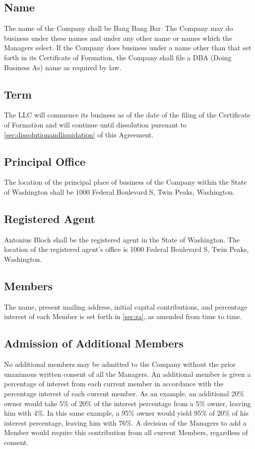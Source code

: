 \documentclass[11pt,onecolumn]{article}
\newcommand{\address}{1000 Federal Boulevard S, Twin Peaks, Washington}
\newcommand{\sa}{\autoref{sec:sa}}
\begin{document}
\subsection{Name}

The name of the Company shall be Bang Bang Bar. The Company may do business under these names and under any other name or names which the Managers select. If the Company does business under a name other than that set forth in its Certificate of Formation, the Company shall file a DBA (Doing Business As) name as required by law.

\subsection{Term}

The LLC will commence its business as of the date of the filing of the Certificate of Formation and will continue until dissolution pursuant to \autoref{sec:dissolutionandliquidation} of this Agreement.

\subsection{Principal Office}

The location of the principal place of business of the Company within the State of Washington shall be \address{}.

\subsection{Registered Agent}

Antonius Bloch shall be the registered agent in the State of Washington. The location of the registered agent's office is \address{}.

\subsection{Members}

The name, present mailing address, initial capital contributions, and percentage interest of each Member is set forth in \sa{}, as amended from time to time.

\subsection{Admission of Additional Members}

No additional members may be admitted to the Company without the prior unanimous written consent of all the Managers.
An additional member is given a percentage of interest from each current member in accordance with the percentage interest of each current member.
As an example, an additional 20\% owner would take 5\% of 20\% of the interest percentage from a 5\% owner, leaving him with 4\%. 
In this same example, a 95\% owner would yield 95\% of 20\% of his interest percentage, leaving him with 76\%. 
A decision of the Managers to add a Member would require this contribution from all current Members, regardless of consent.
\end{document}
